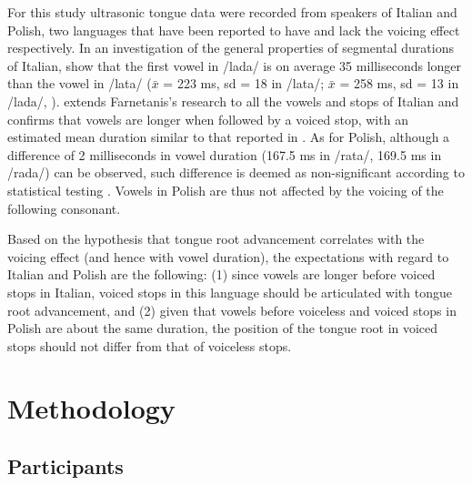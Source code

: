 \documentclass[authoryear, twocolumn]{elsarticle}
\begin{document}
For this study ultrasonic tongue data were recorded from speakers of
Italian and Polish, two languages that have been reported to have and
lack the voicing effect respectively. In an investigation of the general
properties of segmental durations of Italian, \citet{farnetani1986} show
that the first vowel in /lada/ is on average 35 milliseconds longer than
the vowel in /lata/ (\(\bar{x}\) = 223 ms, sd = 18 in /lata/;
\(\bar{x}\) = 258 ms, sd = 13 in /lada/, \citealt[26]{farnetani1986}).
\citet{esposito2002} extends Farnetanis's research to all the vowels and
stops of Italian and confirms that vowels are longer when followed by a
voiced stop, with an estimated mean duration similar to that reported in
\citet{farnetani1986}. As for Polish, although a difference of 2
milliseconds in vowel duration (167.5 ms in /rata/, 169.5 ms in /rada/)
can be observed, such difference is deemed as non-significant according
to statistical testing \citep{keating1984}. Vowels in Polish are thus
not affected by the voicing of the following consonant.

Based on the hypothesis that tongue root advancement correlates with the
voicing effect (and hence with vowel duration), the expectations with
regard to Italian and Polish are the following: (1) since vowels are
longer before voiced stops in Italian, voiced stops in this language
should be articulated with tongue root advancement, and (2) given that
vowels before voiceless and voiced stops in Polish are about the same
duration, the position of the tongue root in voiced stops should not
differ from that of voiceless stops.

\section{Methodology}\label{methodology}

\subsection{Participants}\label{participants}

\end{document}
